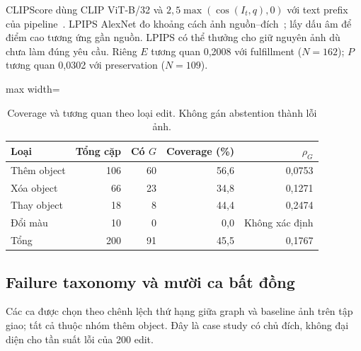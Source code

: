 CLIPScore dùng CLIP ViT-B/32 và $2,5\max(\cos(I_t,q),0)$ với text prefix
của pipeline~\cite{hessel2021clipscore}. LPIPS AlexNet đo khoảng cách ảnh
nguồn--đích~\cite{zhang2018lpips}; lấy dấu âm để điểm cao tương ứng gần nguồn.
LPIPS có thể thưởng cho giữ nguyên ảnh dù chưa làm đúng yêu cầu.
Riêng $E$ tương quan 0,2008 với fulfillment ($N=162$);
$P$ tương quan 0,0302 với preservation ($N=109$).

\begin{table}[!ht]\centering\small
\caption{Coverage và tương quan theo loại edit. Không gán abstention thành lỗi ảnh.}\label{tab:coverage}
\begin{adjustbox}{max width=\linewidth}\begin{tabular}{@{}lrrrr@{}}\toprule
Loại & Tổng cặp & Có $G$ & Coverage (\%) & $\rho_G$\\\midrule
Thêm object & 106 & 60 & 56,6 & 0,0753\\
Xóa object & 66 & 23 & 34,8 & 0,1271\\
Thay object & 18 & 8 & 44,4 & 0,2474\\
Đổi màu & 10 & 0 & 0,0 & Không xác định\\\midrule
Tổng & 200 & 91 & 45,5 & 0,1767\\
\bottomrule\end{tabular}\end{adjustbox}\end{table}


\subsection{Failure taxonomy và mười ca bất đồng}
Các ca được chọn theo chênh lệch thứ hạng giữa graph và baseline ảnh trên tập
giao; tất cả thuộc nhóm thêm object. Đây là case study có chủ đích,
không đại diện cho tần suất lỗi của 200 edit.


